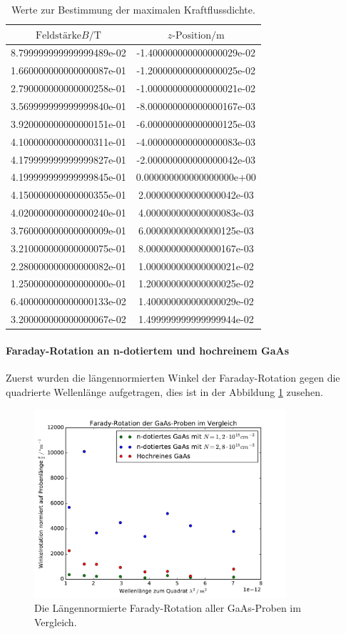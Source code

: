   \begin{table}
   \centering
   \begin{tabular}{S S}
     \toprule
      $\text{Feldstärke} B /\si{\tesla} $ & $z \text{-Position} / \si{\meter} $\\
     \midrule
       8.799999999999999489e-02 & -1.400000000000000029e-02\\
       1.660000000000000087e-01 & -1.200000000000000025e-02\\
       2.790000000000000258e-01 & -1.000000000000000021e-02\\
       3.569999999999999840e-01 & -8.000000000000000167e-03\\
       3.920000000000000151e-01 & -6.000000000000000125e-03\\
       4.100000000000000311e-01 & -4.000000000000000083e-03\\
       4.179999999999999827e-01 & -2.000000000000000042e-03\\
       4.199999999999999845e-01 & 0.000000000000000000e+00\\
       4.150000000000000355e-01 & 2.000000000000000042e-03\\
       4.020000000000000240e-01 & 4.000000000000000083e-03\\
       3.760000000000000009e-01 & 6.000000000000000125e-03\\
       3.210000000000000075e-01 & 8.000000000000000167e-03\\
       2.280000000000000082e-01 & 1.000000000000000021e-02\\
       1.250000000000000000e-01 & 1.200000000000000025e-02\\
       6.400000000000000133e-02 & 1.400000000000000029e-02\\
       3.200000000000000067e-02 & 1.499999999999999944e-02\\
     \bottomrule
   \end{tabular}
   \caption{Werte zur Bestimmung der maximalen Kraftflussdichte.}
   \label{tab:BFeld}
  \end{table}

\paragraph{Faraday-Rotation an n-dotiertem und hochreinem GaAs}
Zuerst wurden die längennormierten Winkel der Faraday-Rotation gegen die quadrierte Wellenlänge 
aufgetragen, dies ist in der Abbildung \ref{fig:Vgl} zusehen. 

\begin{figure}
  \centering
  \includegraphics[height=7cm]{plots/GaAsimVgl.pdf}
  \caption{Die Längennormierte Farady-Rotation aller GaAs-Proben im Vergleich.}
  \label{fig:Vgl}
\end{figure}
